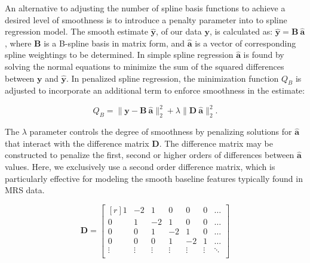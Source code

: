 \documentclass[num-refs]{wiley-article}
\begin{document}
An alternative to adjusting the number of spline basis functions to achieve a desired level of smoothness is to introduce a penalty parameter into to spline regression model. The smooth estimate $\hat{\mathbf{y}}$, of our data $\mathbf{y}$, is calculated as: $\hat{\mathbf{y}} = \mathbf{B} \ \hat{\mathbf{a}}$, where $\mathbf{B}$ is a B-spline basis in matrix form, and $\hat{\mathbf{a}}$ is a vector of corresponding spline weightings to be determined. In simple spline regression $\hat{\mathbf{a}}$ is found by solving the normal equations to minimize the sum of the squared differences between $\mathbf{y}$ and $\hat{\mathbf{y}}$. In penalized spline regression, the minimization function $Q_B$ is adjusted to incorporate an additional term to enforce smoothness in the estimate:

\begin{equation}
  Q_{B} = \|\mathbf{y} - \mathbf{B} \ \hat{\mathbf{a}} \|^{2}_{2} + \lambda \|\mathbf{D} \ \hat{\mathbf{a}}\|^{2}_{2}.
  \label{qb}
\end{equation}

The $\lambda$ parameter controls the degree of smoothness by penalizing solutions for $\hat{\mathbf{a}}$ that interact with the difference matrix $\mathbf{D}$. The difference matrix may be constructed to penalize the first, second or higher orders of differences between $\hat{\mathbf{a}}$ values. Here, we exclusively use a second order difference matrix, which is particularly effective for modeling the smooth baseline features typically found in MRS data.

\begin{equation}
  \mathbf{D} =
  \begin{bmatrix*}[r]
    1 & -2 &  1 &  0 &  0 &  0 & \dots \\
    0 &  1 & -2 &  1 &  0 &  0 & \dots \\
    0 &  0 &  1 & -2 &  1 &  0 & \dots \\
    0 &  0 &  0 &  1 & -2 &  1 & \dots \\
    \vdots & \vdots & \vdots & \vdots & \vdots & \vdots & \ddots \\
  \end{bmatrix*}
  \label{d_mat}
\end{equation}
\end{document}
